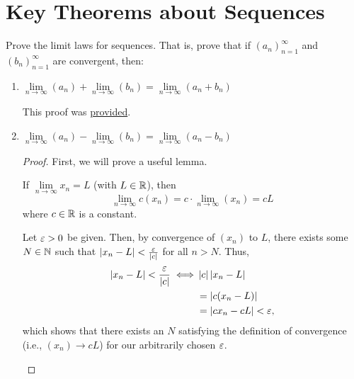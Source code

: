 \section{Key Theorems about Sequences}

\begin{problem}
  \label{prob:limit-laws}
  Prove the limit laws for sequences. That is, prove that if
  $(a_{n})_{n=1}^{\infty}$ and $(b_{n})_{n=1}^{\infty}$ are convergent, then:

    \begin{enumerate}[label=(\alph*)]
      \item $\lim\limits_{n \to \infty} {(a_{n})} + \lim\limits_{n \to \infty} {(b_{n})} = \lim\limits_{n \to \infty} {(a_{n} + b_{n})}$
        \label{prob:sum-limit-law}

        \begin{callout}
          This proof was \href{https://www.youtube.com/watch?v=Q7MzeAaL7bU&t=610s}{provided}.
        \end{callout}


      \item $\lim\limits_{n \to \infty} {(a_{n})} - \lim\limits_{n \to \infty} {(b_{n})} = \lim\limits_{n \to \infty} {(a_{n} - b_{n})}$
        \label{prob:subtraction-limit-law}

        \begin{proof}
          First, we will prove a useful lemma.

          \begin{lemma}
            \label{lem:constant-multiplication-limit-law}
            If $\lim\limits_{n \to \infty} x_{n} = L$ (with $L \in \mathbb{R}$), then 
            \[
              \lim\limits_{n \to \infty} c(x_{n}) = c \cdot \lim\limits_{n \to \infty} (x_{n}) = c L
            \]
            where $c \in \mathbb{R}$ is a constant.
          \end{lemma}

          \begin{subproof}
            Let $\varepsilon > 0$ be given. Then, by convergence of $(x_{n})$ to $L$, there exists
            some $N \in \mathbb{N}$ such that $\left\lvert x_{n} - L \right\rvert < \frac{\varepsilon}{\left\lvert c \right\rvert}$ for all $n > N$.
            Thus, 
            \begin{align*}
              \left\lvert x_{n} - L \right\rvert < \frac{\varepsilon}{\left\lvert c \right\rvert} \iff & \left\lvert c \right\rvert\left\lvert x_{n} - L \right\rvert \\
                                                          &= \left\lvert c(x_{n} - L) \right\rvert \\
                                                          &= \left\lvert cx_{n} - cL \right\rvert < \varepsilon,
            \end{align*}
            which shows that there exists an $N$ satisfying the definition of convergence (i.e., $(x_{n}) \to cL$) for our arbitrarily chosen $\varepsilon$.
          \end{subproof}


\end{proof}
\end{enumerate}
\end{problem}
